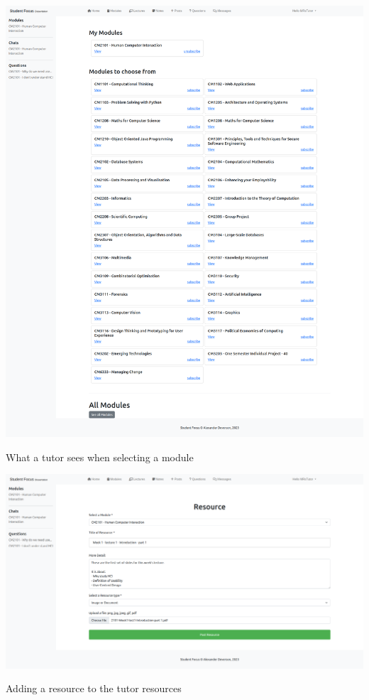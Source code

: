 \includegraphics[scale=0.20]{images/application/30 - tutor_module_selection.png}

What a tutor sees when selecting a module

\includegraphics[scale=0.20]{images/application/31 - tutor_add_resource.png}

Adding a resource to the tutor resources

